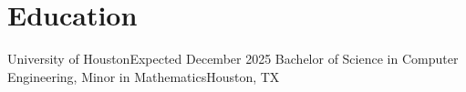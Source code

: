\section{Education}
    \resumeSubHeadingListStart
    \resumeSubheading
    {University of Houston}{Expected December 2025}
    {Bachelor of Science in Computer Engineering, Minor in Mathematics}{Houston, TX}
    \resumeItemListStart
    \resumeItemListEnd
  \resumeSubHeadingListEnd
